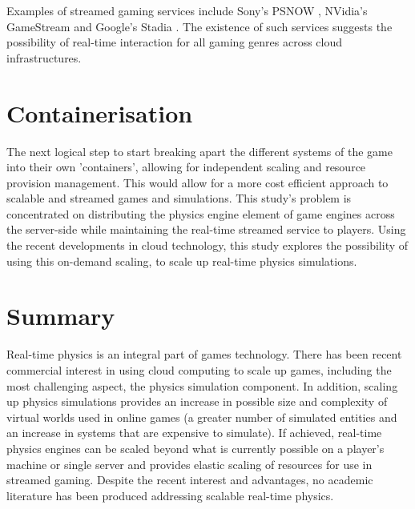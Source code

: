 Examples of streamed gaming services include Sony's PSNOW \cite{PSNOW}, NVidia's GameStream \cite{NVidiaGameStream} and Google's Stadia \cite{Stadia}. The existence of such services suggests the possibility of real-time interaction for all gaming genres across cloud infrastructures.




\section{Containerisation}
The next logical step to start breaking apart the different systems of the game into their own 'containers', allowing for independent scaling and resource provision management. This would allow for a more cost efficient approach to scalable and streamed games and simulations. This study's problem is concentrated on distributing the physics engine element of game engines across the server-side while maintaining the real-time streamed service to players.
Using the recent developments in cloud technology, this study explores the possibility of using this on-demand scaling, to scale up real-time physics simulations.

\section{Summary}
Real-time physics is an integral part of games technology. There has been recent commercial interest in using cloud computing to scale up games, including the most challenging aspect, the physics simulation component. In addition, scaling up physics simulations provides an increase in possible size and complexity of virtual worlds used in online games (a greater number of simulated entities and an increase in systems that are expensive to simulate). If achieved, real-time physics engines can be scaled beyond what is currently possible on a player's machine or single server and provides elastic scaling of resources for use in streamed gaming. Despite the recent interest and advantages, no academic literature has been produced addressing scalable real-time physics.

